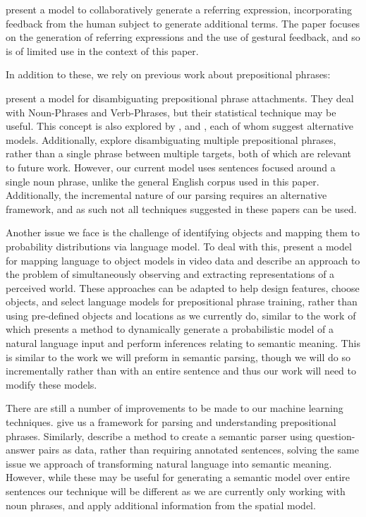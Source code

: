 \documentclass[letterpaper,10pt]{article}
\begin{document}
\citet{fang2015embodied} present a model to collaboratively generate a referring expression, incorporating feedback from the human subject to generate additional terms. The paper focuses on the generation of referring expressions and the use of gestural feedback, and so is of limited use in the context of this paper.

In addition to these, we rely on previous work about prepositional phrases:

\citet{collins95} present a model for disambiguating prepositional phrase attachments. They deal with Noun-Phrases and Verb-Phrases, but their statistical technique may be useful. This concept is also explored by \citet{ratna98}, and \citet{brill94}, each of whom suggest alternative models. Additionally, \citet{merlo97} explore disambiguating multiple prepositional phrases, rather than a single phrase between multiple targets, both of which are relevant to future work. However, our current model uses sentences focused around a single noun phrase, unlike the general English corpus used in this paper. Additionally, the incremental nature of our parsing requires an alternative framework, and as such not all techniques suggested in these papers can be used.

Another issue we face is the challenge of identifying objects and mapping them to probability distributions via language model. To deal with this, \citet{barbu13} present a model for mapping language to object models in video data and \citet{UW_RSE_ICML2012} describe an approach to the problem of simultaneously observing and extracting representations of a perceived world. These approaches can be adapted to help design features, choose objects, and select language models for prepositional phrase training, rather than using pre-defined objects and locations as we currently do, similar to the work of \citet{tellex2011understanding} which presents a method to dynamically generate a probabilistic model of a natural language input and perform inferences relating to semantic meaning. This is similar to the work we will preform in semantic parsing, though we will do so incrementally rather than with an entire sentence and thus our work will need to modify these models.

There are still a number of improvements to be made to our machine learning techniques. \citet{rudzicz03} give us a framework for parsing and understanding prepositional phrases. Similarly, \citet{liang2013learning} describe a method to create a semantic parser using question-answer pairs as data, rather than requiring annotated sentences, solving the same issue we approach of transforming natural language into semantic meaning. However, while these may be useful for generating a semantic model over entire sentences our technique will be different as we are currently only working with noun phrases, and apply additional information from the spatial model. 
\end{document}
